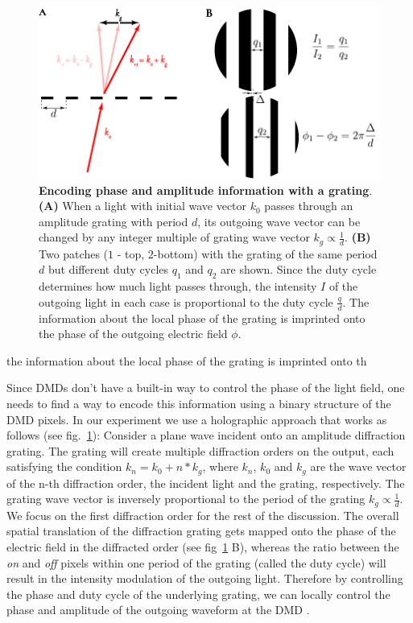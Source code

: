 \begin{figure}[t]
	\centering
	\includegraphics[scale=1]{figures/DMD_grating.pdf}
	\caption{{\bf Encoding phase and amplitude information with a grating}. {\bf (A)} When a light with initial wave vector $k_0$ passes through an amplitude grating with period $d$, its outgoing wave vector can be changed by any integer multiple of grating wave vector $k_g\propto \frac{1}{d}$. {\bf (B)} Two patches ($1$ - top, $2$-bottom) with the grating of the same period $d$ but different duty cycles $q_1$ and $q_2$ are shown. Since the duty cycle determines how much light passes through, the intensity $I$ of the outgoing light in each case is proportional to the duty cycle $\frac{q}{d}$. The information about the local phase of the grating is imprinted onto the phase of the outgoing electric field $\phi$.}
	\label{fig:DMD_grating}
\end{figure}

the information about the local phase of the grating is imprinted onto th

Since DMDs don't have a built-in way to control the phase of the light field, one needs to find a way to encode this information using a binary structure of the DMD pixels. In our experiment we use a holographic approach that works as follows (see fig.~\ref{fig:DMD_grating}): Consider a plane wave incident onto an amplitude diffraction grating. The grating will create multiple diffraction orders on the output, each satisfying the condition $k_n = k_0 + n*k_g$, where $k_n$, $k_0$ and $k_g$ are the wave vector of the n-th diffraction order, the incident light and the grating, respectively. The grating wave vector is inversely proportional to the period of the grating $k_g \propto \frac{1}{d}$. We focus on the first diffraction order for the rest of the discussion. The overall spatial translation of the diffraction grating gets mapped onto the phase of the electric field in the diffracted order (see fig~\ref{fig:DMD_grating} B), whereas the ratio between the \textit{on} and \textit{off} pixels within one period of the grating (called the duty cycle) will result in the intensity modulation of the outgoing light. Therefore by controlling the phase and duty cycle of the underlying grating, we can locally control the phase and amplitude of the outgoing waveform at the DMD \cite{ZupancicThesis}.

